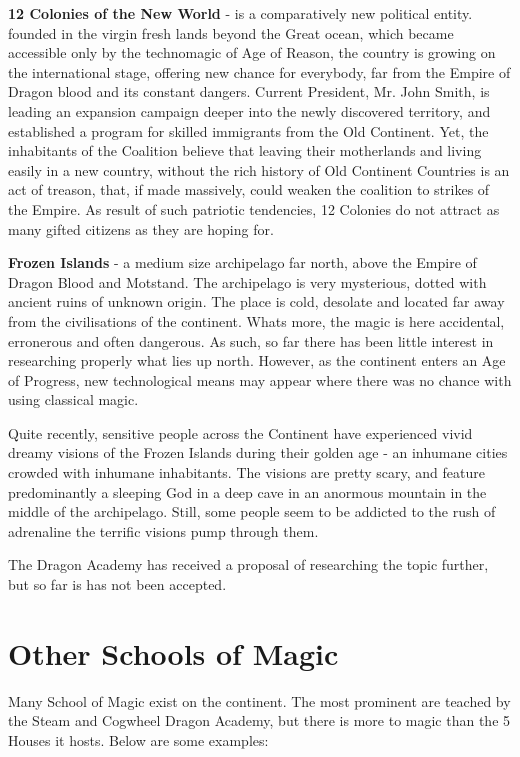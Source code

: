 \documentclass[a4paper,11pt]{article}
\begin{document}
\textbf{12 Colonies of the New World} - is a comparatively new political entity. founded in the virgin fresh lands beyond the Great ocean, which became accessible only by the technomagic of Age of Reason, the country is growing on the international stage, offering new chance for everybody, far from the Empire of Dragon blood and its constant dangers. Current President, Mr. John Smith, is leading an expansion campaign deeper into the newly discovered territory, and established a program for skilled immigrants from the Old Continent. Yet, the inhabitants of the Coalition believe that leaving their motherlands and living easily in a new country, without the rich history of Old Continent Countries is an act of treason, that, if made massively, could weaken the coalition to strikes of the Empire. As result of such patriotic tendencies, 12 Colonies do not attract as many gifted citizens as they are hoping for. 

\textbf{Frozen Islands} - a medium size archipelago far north, above the Empire of Dragon Blood and Motstand. The archipelago is very mysterious, dotted with ancient ruins of unknown origin. The place is cold, desolate and located far away from the civilisations of the continent. Whats more, the magic is here accidental, erronerous and often dangerous. As such, so far there has been little interest in researching properly what lies up north. However, as the continent enters an Age of Progress, new technological means may appear where there was no chance with using classical magic.  

Quite recently, sensitive people across the Continent have experienced vivid dreamy visions of the Frozen Islands during their golden age - an inhumane cities crowded with inhumane inhabitants. The visions are pretty scary, and feature predominantly a sleeping God in a deep cave in an anormous mountain in the middle of the archipelago. Still, some people seem to be addicted to the rush of adrenaline the terrific visions pump through them.

The Dragon Academy has received a proposal of researching the topic further, but so far is has not been accepted. 

\newpage

\section{Other Schools of Magic}

Many School of Magic exist on the continent. The most prominent are teached by the Steam and Cogwheel Dragon Academy, but there is more to magic than the 5 Houses it hosts. Below are some examples:
\end{document}
